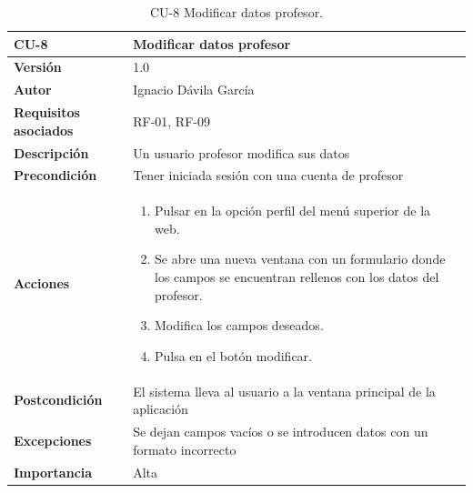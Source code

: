 \begin{table}[p]
	\centering
	\begin{tabularx}{\linewidth}{ p{} p{} }
		\toprule
		\textbf{CU-8}    & \textbf{Modificar datos profesor}\\
		\toprule
		\textbf{Versión}              & 1.0    \\
		\textbf{Autor}                & Ignacio Dávila García \\
		\textbf{Requisitos asociados} & RF-01, RF-09 \\
		\textbf{Descripción}          & Un usuario profesor modifica sus datos \\
		\textbf{Precondición}         & Tener iniciada sesión con una cuenta de profesor \\
		\textbf{Acciones}             &
		\begin{enumerate}
			\def\labelenumi{\arabic{enumi}.}
			\tightlist
			\item Pulsar en la opción perfil del menú superior de la web.
			\item Se abre una nueva ventana con un formulario donde los campos se encuentran rellenos con los datos del profesor.
			\item Modifica los campos deseados.
			\item Pulsa en el botón modificar.
		\end{enumerate}\\
		\textbf{Postcondición}        & El sistema lleva al usuario a la ventana principal de la aplicación \\
		\textbf{Excepciones}          & Se dejan campos vacíos o se introducen datos con un formato incorrecto \\
		\textbf{Importancia}          & Alta \\
		\bottomrule
	\end{tabularx}
	\caption{CU-8 Modificar datos profesor.}
\end{table}


